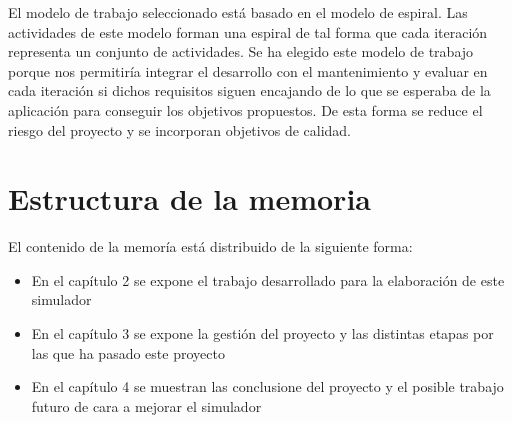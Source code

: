El modelo de trabajo seleccionado está basado en el modelo de espiral. Las actividades de este modelo forman una espiral de tal forma que cada iteración representa un conjunto de actividades. Se ha elegido este modelo de trabajo porque nos permitiría integrar el desarrollo con el mantenimiento y evaluar en cada iteración si dichos requisitos siguen encajando de lo que se esperaba de la aplicación para conseguir los objetivos propuestos. De esta forma se reduce el riesgo del proyecto y se incorporan objetivos de calidad.

\section{Estructura de la memoria}

El contenido de la memoría está distribuido de la siguiente forma:

\begin{itemize}
	\item En el capítulo 2 se expone el trabajo desarrollado para la elaboración de este simulador
	\item En el capítulo 3 se expone la gestión del proyecto y las distintas etapas por las que ha pasado este proyecto
	\item En el capítulo 4 se muestran las conclusione del proyecto y el posible trabajo futuro de cara a mejorar el simulador 
\end{itemize}